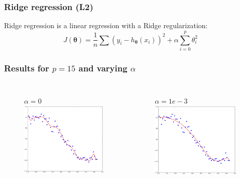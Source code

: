 \documentclass[handout]{beamer}
\begin{document}
\begin{frame}
\frametitle{Ridge regression (L2)}
\begin{block}{}
Ridge regression is a linear regression with a Ridge regularization:
$$
J(\bm{\theta}) = \frac{1}{n} \sum (y_i - h_{\bm{\theta}}(x_i))^2 + \alpha \sum_{i=0}^p \theta_i^2
$$
\end{block}
\end{frame}

\begin{frame}
\frametitle{Results for $p=15$ and varying $\alpha$}
\begin{columns}
\vspace{-2em}
\begin{figure}
$\alpha=0$
\includegraphics[width=0.99\textwidth]{./fig/L1/ridge_alpha0.png}
\end{figure}
\vspace{-2em}
\begin{figure}
$\alpha=1e-3$
\includegraphics[width=0.99\textwidth]{./fig/L1/ridge_alpha1e-3.png}

\end{figure}
\end{columns}
\end{frame}
\end{document}

